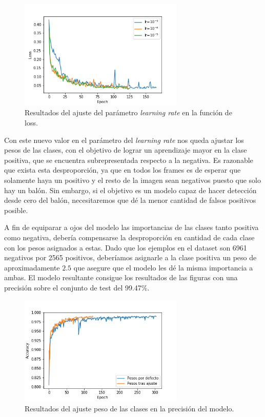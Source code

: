 \begin{figure}[H]
  \centering
  \includegraphics[width=0.7\textwidth]{images/lr_loss}
  \caption{Resultados del ajuste del parámetro \textit{learning rate} en la función de loss.}
  \label{fig:lr_loss}
\end{figure}

Con este nuevo valor en el parámetro del \textit{learning rate} nos queda ajustar los pesos de las clases, con el objetivo de lograr un aprendizaje mayor en la clase positiva, que se encuentra subrepresentada respecto a la negativa. Es razonable que exista esta desproporción, ya que en todos los frames es de esperar que solamente haya un positivo y el resto de la imagen sean negativos puesto que solo hay un balón. Sin embargo, si el objetivo es un modelo capaz de hacer detección desde cero del balón, necesitaremos que dé la menor cantidad de falsos positivos posible.

A fin de equiparar a ojos del modelo las importancias de las clases tanto positiva como negativa, debería compensarse la desproporción en cantidad de cada clase con los pesos asignados a estas. Dado que los ejemplos en el dataset son 6961 negativos por 2565 positivos, deberíamos asignarle a la clase positiva un peso de aproximadamente $2.5$ que asegure que el modelo les dé la misma importancia a ambas. El modelo resultante consigue los resultados de las figuras con una precisión sobre el conjunto de test del 99.47\%.

\begin{figure}[H]
  \centering
  \includegraphics[width=0.7\textwidth]{images/cw_acc.png}
  \caption{Resultados del ajuste peso de las clases en la precisión del modelo.}
  \label{fig:cw_acc}
\end{figure}

